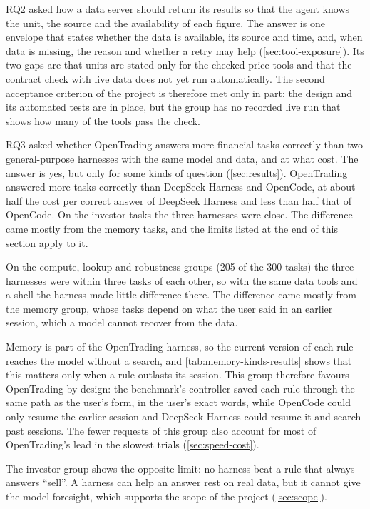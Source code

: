 RQ2 asked how a data server should return its results so that the agent knows the unit, the source and the availability of each figure.
The answer is one envelope that states whether the data is available, its source and time, and, when data is missing, the reason and whether a retry may help (\cref{sec:tool-exposure}).
Its two gaps are that units are stated only for the checked price tools and that the contract check with live data does not yet run automatically.
The second acceptance criterion of the project is therefore met only in part: the design and its automated tests are in place, but the group has no recorded live run that shows how many of the tools pass the check.

RQ3 asked whether OpenTrading answers more financial tasks correctly than two general-purpose harnesses with the same model and data, and at what cost.
The answer is yes, but only for some kinds of question (\cref{sec:results}).
OpenTrading answered more tasks correctly than DeepSeek Harness and OpenCode, at about half the cost per correct answer of DeepSeek Harness and less than half that of OpenCode.
On the investor tasks the three harnesses were close.
The difference came mostly from the memory tasks, and the limits listed at the end of this section apply to it.

\label{sec:harness-difference}
On the compute, lookup and robustness groups (205 of the 300 tasks) the three harnesses were within three tasks of each other, so with the same data tools and a shell the harness made little difference there.
The difference came mostly from the memory group, whose tasks depend on what the user said in an earlier session, which a model cannot recover from the data.

Memory is part of the OpenTrading harness, so the current version of each rule reaches the model without a search, and \cref{tab:memory-kinds-results} shows that this matters only when a rule outlasts its session.
This group therefore favours OpenTrading by design: the benchmark's controller saved each rule through the same path as the user's form, in the user's exact words, while OpenCode could only resume the earlier session and DeepSeek Harness could resume it and search past sessions.
The fewer requests of this group also account for most of OpenTrading's lead in the slowest trials (\cref{sec:speed-cost}).

The investor group shows the opposite limit: no harness beat a rule that always answers \enquote{sell}.
A harness can help an answer rest on real data, but it cannot give the model foresight, which supports the scope of the project (\cref{sec:scope}).

